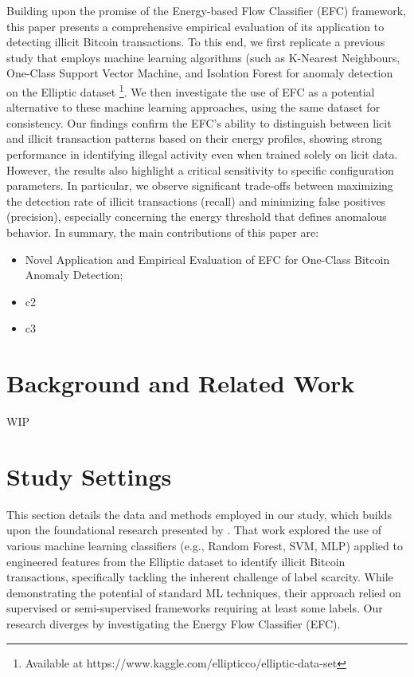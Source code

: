 \documentclass[12pt]{article}
\begin{document}
Building upon the promise of the Energy-based Flow Classifier (EFC) framework, this paper presents a comprehensive empirical
evaluation of its application to detecting illicit Bitcoin transactions. To this end, we first replicate a previous study
that employs machine learning algorithms (such as K-Nearest Neighbours, One-Class Support Vector Machine, and Isolation
Forest for anomaly detection on the Elliptic dataset \footnote{Available at https://www.kaggle.com/ellipticco/elliptic-data-set}.
We then investigate the use of EFC as a potential alternative to these machine learning approaches, using the same dataset
for consistency. Our findings confirm the EFC's ability to distinguish between licit and illicit transaction patterns based
on their energy profiles, showing strong performance in identifying illegal activity even when trained solely on licit data.
However, the results also highlight a critical sensitivity to specific configuration parameters. In particular, we observe
significant trade-offs between maximizing the detection rate of illicit transactions (recall) and minimizing false positives
(precision), especially concerning the energy threshold that defines anomalous behavior.
In summary, the main contributions of this paper are:

\begin{itemize}
    \item Novel Application and Empirical Evaluation of EFC for One-Class Bitcoin Anomaly Detection;
    \item c2
    \item c3
\end{itemize}

\section{Background and Related Work} \label{sec:background}
WIP

\section{Study Settings} \label{sec:methods}
This section details the data and methods employed in our study, which builds upon the foundational research presented
by \cite{lorenz2021machinelearningmethodsdetect}. That work explored the use of various machine learning classifiers
(e.g., Random Forest, SVM, MLP) applied to engineered features from the Elliptic dataset to identify illicit Bitcoin transactions,
specifically tackling the inherent challenge of label scarcity. While demonstrating the potential of standard ML techniques,
their approach relied on supervised or semi-supervised frameworks requiring at least some labels. Our research
diverges by investigating the Energy Flow Classifier (EFC). 
\end{document}
